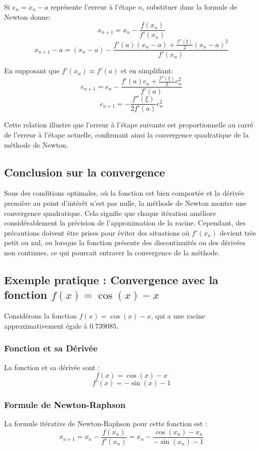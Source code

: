 \documentclass{article}
\begin{document}
Si \( e_n = x_n - a \) représente l'erreur à l'étape \( n \), substituer dans la formule de Newton donne:
\[ x_{n+1} = x_n - \frac{f(x_n)}{f'(x_n)} \]
\[ x_{n+1} - a = (x_n - a) - \frac{f'(a)(x_n - a) + \frac{f''(\xi)}{2}(x_n - a)^2}{f'(x_n)} \]

En supposant que \( f'(x_n) \approx f'(a) \) et en simplifiant:
\[ e_{n+1} = e_n - \frac{f'(a)e_n + \frac{f''(\xi)}{2}e_n^2}{f'(a)} \]
\[ e_{n+1} = -\frac{f''(\xi)}{2f'(a)}e_n^2 \]

Cette relation illustre que l'erreur à l'étape suivante est proportionnelle au carré de l'erreur à l'étape actuelle, confirmant ainsi la convergence quadratique de la méthode de Newton.

\subsection{Conclusion sur la convergence}
Sous des conditions optimales, où la fonction est bien comportée et la dérivée première au point d'intérêt n'est pas nulle, la méthode de Newton montre une convergence quadratique. Cela signifie que chaque itération améliore considérablement la précision de l'approximation de la racine. Cependant, des précautions doivent être prises pour éviter des situations où \( f'(x_n) \) devient très petit ou nul, ou lorsque la fonction présente des discontinuités ou des dérivées non continues, ce qui pourrait entraver la convergence de la méthode.


\subsection{Exemple pratique : Convergence avec la fonction \( f(x) = \cos(x) - x \)}

Considérons la fonction \( f(x) = \cos(x) - x \), qui a une racine approximativement égale à \( 0.739085 \).

\subsubsection{Fonction et sa Dérivée}

La fonction et sa dérivée sont :
$$ f(x) = \cos(x) - x $$
$$ f'(x) = -\sin(x) - 1 $$

\subsubsection{Formule de Newton-Raphson}

La formule itérative de Newton-Raphson pour cette fonction est :
$$ x_{n+1} = x_n - \frac{f(x_n)}{f'(x_n)} = x_n - \frac{\cos(x_n) - x_n}{-\sin(x_n) - 1} $$
\end{document}
